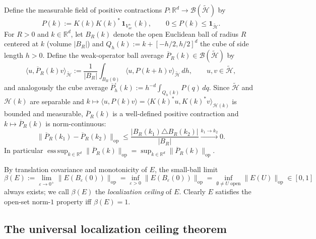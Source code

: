\documentclass[11pt,a4paper]{article}
\theoremstyle{definition}
\theoremstyle{remark}
\newcommand{\HH}{\mathcal{H}}
\newcommand{\tH}{\widetilde{\mathcal{H}}}
\newcommand{\BB}{\mathcal{B}}
\newcommand{\RR}{\mathbb{R}}
\newcommand{\op}{\mathrm{op}}
\newcommand{\ac}{\mathrm{ac}}
\newcommand{\one}{\mathbf{1}}
\newcommand{\ip}[2]{\langle #1, #2 \rangle}
\newcommand{\norm}[1]{\|#1\|}
\DeclareMathOperator*{\esssup}{ess\,sup}
\begin{document}
Define the measurable field of positive contractions $P:\RR^d\to\BB(\tH)$ by
\begin{equation}\label{eq:Pdef}
P(k) := K(k)K(k)^*\,\one_{V_\ac^+}(k), \qquad 0\le P(k)\le\one_{\tH}.
\end{equation}
For $R>0$ and $k\in\RR^d$, let $B_R(k)$ denote the open Euclidean ball of radius $R$ centered at $k$ (volume $|B_R|$) and $Q_h(k) := k + [-h/2,h/2]^d$ the cube of side length $h>0$. Define the weak-operator ball average $\overline{P}_R(k)\in\BB(\tH)$ by
\begin{equation}\label{eq:Pbar}
\ip{u}{\overline{P}_R(k)v}_{\tH} := \frac{1}{|B_R|}\int_{B_R(0)} \ip{u}{P(k+h)v}_{\tH}\,dh, \qquad u,v\in\tH,
\end{equation}
and analogously the cube average $\overline{P}_h^{\square}(k) := h^{-d}\int_{Q_h(k)} P(q)\,dq$. Since $\tH$ and $\HH(k)$ are separable and $k\mapsto \ip{u}{P(k)v}=\ip{K(k)^*u}{K(k)^*v}_{\HH(k)}$ is bounded and measurable, $\overline{P}_R(k)$ is a well-defined positive contraction and $k\mapsto\overline{P}_R(k)$ is norm-continuous:
\[
\norm{\overline{P}_R(k_1)-\overline{P}_R(k_2)}_{\op} \le \frac{|B_R(k_1)\triangle B_R(k_2)|}{|B_R|} \xrightarrow{k_1\to k_2} 0.
\]
In particular $\esssup_{k\in\RR^d}\norm{\overline{P}_R(k)}_{\op}=\sup_{k\in\RR^d}\norm{\overline{P}_R(k)}_{\op}$.

By translation covariance and monotonicity of $E$, the small-ball limit
\begin{equation}\label{eq:betadef}
\beta(E) := \lim_{\varepsilon\to 0^+}\norm{E(B_\varepsilon(0))}_{\op} = \inf_{\varepsilon>0}\norm{E(B_\varepsilon(0))}_{\op} = \inf_{\emptyset\neq U\text{ open}}\norm{E(U)}_{\op} \in [0,1]
\end{equation}
always exists; we call $\beta(E)$ the \emph{localization ceiling} of $E$. Clearly $E$ satisfies the open-set norm-$1$ property iff $\beta(E)=1$.

\subsection{The universal localization ceiling theorem}
\end{document}
